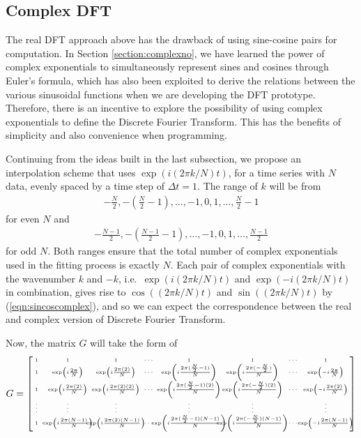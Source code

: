 \subsection{Complex DFT}

The real DFT approach above has the drawback of using sine-cosine pairs for computation. In Section \ref{section:complexno}, we have learned the power of complex exponentials to simultaneously represent sines and cosines through Euler's formula, which has also been exploited to derive the relations between the various sinusoidal functions when we are developing the DFT prototype. Therefore, there is an incentive to explore the possibility of using complex exponentials to define the Discrete Fourier Transform. This has the benefits of simplicity and also convenience when programming.

Continuing from the ideas built in the last subsection, we propose an interpolation scheme that uses $\exp(i (2\pi k/N) t)$, for a time series with $N$ data, evenly spaced by a time step of $\Delta t = 1$. The range of $k$ will be from 
\begin{align*}
-\frac{N}{2}, -\left(\frac{N}{2}-1\right), \ldots, -1, \allowbreak 0, 1, \ldots, \frac{N}{2}-1  
\end{align*}for even $N$ and
\begin{align*}
-\frac{N-1}{2}, -\left(\frac{N-1}{2}-1\right), \dots, -1, 0, 1, \ldots, \frac{N-1}{2} 
\end{align*} for odd $N$. Both ranges ensure that the total number of complex exponentials used in the fitting process is exactly $N$. Each pair of complex exponentials with the wavenumber $k$ and $-k$, i.e.\ $\exp(i (2\pi k/N) t)$ and $\exp(-i (2\pi k/N) t)$ in combination, gives rise to $\cos( (2\pi k/N) t)$ and $\sin((2\pi k/N) t)$ by (\ref{eqn:sincoscomplex}), and so we can expect the correspondence between the real and complex version of Discrete Fourier Transform.\par
Now, the matrix $G$ will take the form of
\begin{align}
G = \tiny
\renewcommand\arraystretch{1.33}
\left[\begin{array}{@{\,}wc{5pt}wc{40pt}wc{40pt}wc{8pt}wc{56pt}wc{56pt}wc{8pt}wc{40pt}}
1 & 1 & 1 & \cdots & 1 & 1 & \cdots & 1\\
1 & \exp(i\frac{2\pi}{N}) & \exp(i\frac{2\pi(2)}{N}) & \cdots & \exp(i\frac{2\pi(\frac{N}{2}-1)}{N}) & \exp(i\frac{2\pi(-\frac{N}{2})}{N}) & \cdots & \exp(-i\frac{2\pi}{N}) \\
1 & \exp(i\frac{2\pi(2)}{N}) & \exp(i\frac{2\pi(2)(2)}{N}) & \cdots & \exp(i\frac{2\pi(\frac{N}{2}-1)(2)}{N}) & \exp(i\frac{2\pi(-\frac{N}{2})(2)}{N}) & \cdots & \exp(-i\frac{2\pi(2)}{N})\\
\vdots & \vdots & \vdots &  & \vdots & \vdots &  & \vdots \\
1 & \exp(i\frac{2\pi(N-1)}{N}) & \exp(i\frac{2\pi(2)(N-1)}{N}) & \cdots & \exp(i\frac{2\pi(\frac{N}{2}-1)(N-1)}{N}) & \exp(i\frac{2\pi(-\frac{N}{2})(N-1)}{N}) & \cdots & \exp(-i\frac{2\pi(N-1)}{N}) \\
\end{array}\right]
\end{align}
